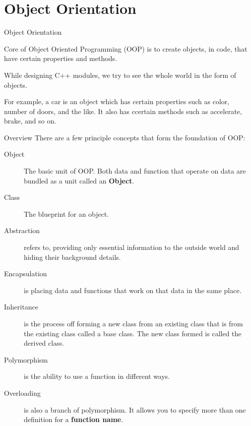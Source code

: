 \documentclass[../lecture5-objectorientation.tex]{subfiles}
\begin{document}
\section{Object Orientation}


\begin{frame}[fragile]{Object Orientation}

    Core of Object Oriented Programming (OOP) is to create objects, in code, that have certain properties and methods. \newline

    While designing C++ modules, we try to see the whole world in the form of objects. \newline

    For example, a car is an object which has certain properties such as color, number of doors, and the like. It also has ccertain methods such as accelerate, brake, and so on.
\end{frame}


\begin{frame}[fragile]{Overview}
    There are a few principle concepts that form the foundation of OOP:
    \begin{description}
        \item[Object] The basic unit of OOP. Both data and function that operate on data are bundled as a unit called an \textbf{Object}.
        \item[Class] The blueprint for an object.
        \item[Abstraction] refers to, providing only essential information to the outside world and hiding their background details.
        \item[Encapsulation] is placing data and functions that work on that data in the same place.
        \item[Inheritance] is the process off forming a new class from an existing class that is from the existing class called a base class. The new class formed is called the derived class.
        \item[Polymorphism] is the ability to use a function in different ways.
        \item[Overloading] is also a branch of polymorphism. It allows you to specify more than one definition for a \textbf{function name}.
    \end{description}
\end{frame}
\end{document}
